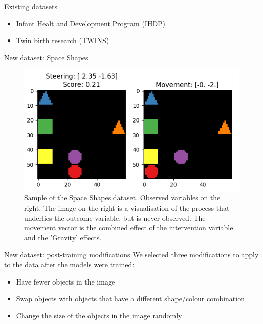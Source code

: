 \documentclass[dvipsnames, aspectratio=169]{beamer}
\begin{document}
	\begin{frame}{Existing datasets}
	    \begin{itemize}
	        \item Infant Healt and Development Program (IHDP)
	        \item Twin birth research (TWINS)
	    \end{itemize}
	\end{frame}
	\begin{frame}{New dataset: Space Shapes}
	    \begin{figure}
	        \centering
	        \includegraphics[width=1.0\textwidth]{latex/Images/sample_space_shapes_score_left.png}
	        \caption{Sample of the Space Shapes dataset. Observed variables on the right. The image on the right is a visualisation of the process that underlies the outcome variable, but is never observed. The movement vector is the combined effect of the intervention variable and the 'Gravity' effects.}
	    \end{figure}
	\end{frame}
	\begin{frame}{New dataset: post-training modifications}
	    We selected three modifications to apply to the data after the models were trained:
	    \begin{itemize}
	        \item Have fewer objects in the image
	        \item Swap objects with objects that have a different shape/colour combination
	        \item Change the size of the objects in the image randomly
	    \end{itemize}
	\end{frame}
\end{document}
